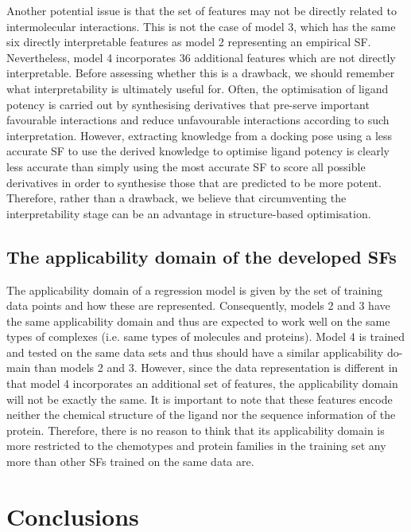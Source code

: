 Another potential issue is that the set of features may not be directly related to intermolecular interactions. This is not the case of model 3, which has the same six directly interpretable features as model 2 representing an empirical SF. Nevertheless, model 4 incorporates 36 additional features which are not directly interpretable. Before assessing whether this is a drawback, we should remember what interpretability is ultimately useful for. Often, the optimisation of ligand potency is carried out by synthesising derivatives that pre-serve important favourable interactions and reduce unfavourable interactions according to such interpretation. However, extracting knowledge from a docking pose using a less accurate SF to use the derived knowledge to optimise ligand potency is clearly less accurate than simply using the most accurate SF to score all possible derivatives in order to synthesise those that are predicted to be more potent. Therefore, rather than a drawback, we believe that circumventing the interpretability stage can be an advantage in structure-based optimisation.

\subsection{The applicability domain of the developed SFs}

The applicability domain of a regression model is given by the set of training data points and how these are represented. Consequently, models 2 and 3 have the same applicability domain and thus are expected to work well on the same types of complexes (i.e. same types of molecules and proteins). Model 4 is trained and tested on the same data sets and thus should have a similar applicability do-main than models 2 and 3. However, since the data representation is different in that model 4 incorporates an additional set of features, the applicability domain will not be exactly the same. It is important to note that these features encode neither the chemical structure of the ligand nor the sequence information of the protein. Therefore, there is no reason to think that its applicability domain is more restricted to the chemotypes and protein families in the training set any more than other SFs trained on the same data are.

\section{Conclusions}

